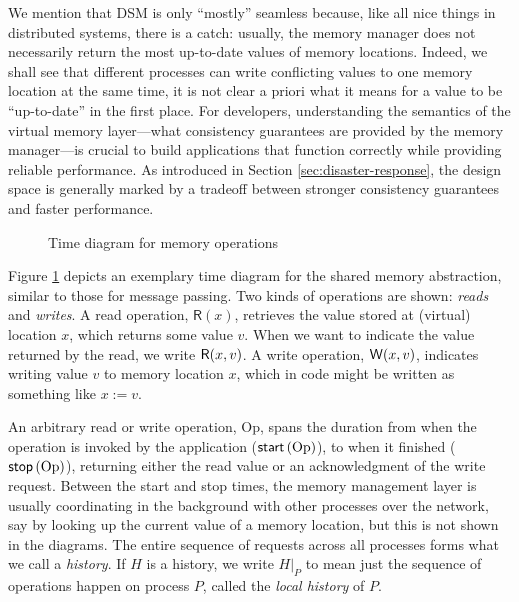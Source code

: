 \documentclass[]             %
{NASA}                       %
\theoremstyle{definition}
\begin{document}
We mention that DSM is only ``mostly'' seamless because, like all nice
things in distributed systems, there is a catch: usually, the memory
manager does not necessarily return the most up-to-date values of
memory locations. Indeed, we shall see that different processes can
write conflicting values to one memory location at the same time, it
is not clear a priori what it means for a value to be ``up-to-date''
in the first place. For developers, understanding the semantics of the
virtual memory layer---what consistency guarantees are provided by the
memory manager---is crucial to build applications that function
correctly while providing reliable performance. As introduced in
Section \ref{sec:disaster-response}, the design space is generally
marked by a tradeoff between stronger consistency guarantees and
faster performance.

\begin{figure}
    \centering
    
    \caption{Time diagram for memory operations}
    \label{fig:smEx1}
\end{figure}

\newcommand{\Op}{\mathrm{Op}}

Figure \ref{fig:smEx1} depicts an exemplary time diagram for the
shared memory abstraction, similar to those for message passing. Two
kinds of operations are shown: \emph{reads} and \emph{writes}. A read
operation, $\mathsf{R}(x)$, retrieves the value stored at (virtual)
location $x$, which returns some value $v$. When we want to indicate
the value returned by the read, we write $\mathsf{R}\!\left(x, v\right)$. A write
operation, $\mathsf{W}\!\left(x, v\right)$, indicates writing value $v$ to memory
location $x$, which in code might be written as something like
$x := v$.

An arbitrary read or write operation, $\Op$, spans the duration from
when the operation is invoked by the application ($\memstart{\Op}$),
to when it finished ($\memstop{\Op}$), returning either the read value
or an acknowledgment of the write request. Between the start and stop
times, the memory management layer is usually coordinating in the
background with other processes over the network, say by looking up
the current value of a memory location, but this is not shown in the
diagrams. The entire sequence of requests across all processes forms
what we call a \emph{history}. If $H$ is a history, we write $H|_P$ to
mean just the sequence of operations happen on process $P$, called the
\emph{local history} of $P$.
\end{document}
